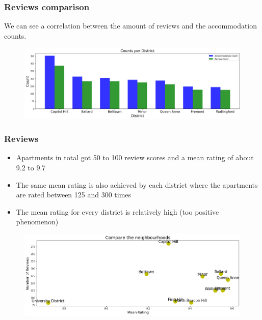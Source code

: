 \documentclass{beamer}
\begin{document}

\begin{frame}
\frametitle{Reviews comparison}
We can see a correlation between the amount of reviews and the accommodation counts. 
\begin{figure}
\includegraphics[width=0.8\linewidth]{photo/3_count_per_district}
\end{figure}
\end{frame}


\begin{frame}
\frametitle{Reviews}
\begin{itemize}
\item Apartments in total got 50 to 100 review scores and a mean rating of about 9.2 to 9.7 
\item The same mean rating is also achieved by each district where the apartments are rated between 125 and 300 times 
\item The mean rating for every district is relatively high (too positive phenomenon)
\end{itemize}
%
\begin{figure}
\includegraphics[width=0.8\linewidth]{photo/2_2_compare_the_neighbourhoods}
\end{figure}
\end{frame}

\end{document}
